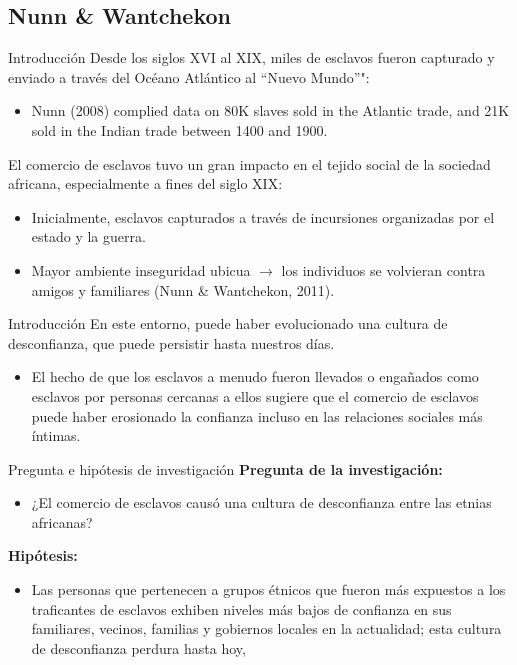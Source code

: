 \documentclass[11pt, aspectratio=169, compress]{beamer}
\begin{document}
\subsection{Nunn \& Wantchekon}
\begin{frame}{Introducción}
Desde los siglos XVI al XIX, miles de esclavos fueron capturado y enviado a través del Océano Atlántico al ``Nuevo Mundo''": 
\begin{itemize}
	\item Nunn (2008) complied data on 80K slaves sold in the Atlantic
	trade, and 21K sold in the Indian trade between 1400 and 1900.
\end{itemize}
El comercio de esclavos tuvo un gran impacto en el tejido social de la sociedad africana, especialmente a fines del siglo XIX: 
\begin{itemize}
	\item  Inicialmente, esclavos capturados a través de incursiones organizadas por el estado y la guerra. 
	\item Mayor ambiente inseguridad ubicua $ \rightarrow $ los individuos se volvieran contra amigos y familiares (Nunn \& Wantchekon, 2011). 
\end{itemize}
\end{frame}
\begin{frame}{Introducción}
En este entorno, puede haber evolucionado una cultura de desconfianza, que puede persistir hasta nuestros días.
\begin{itemize}
	\item El hecho de que los esclavos a menudo fueron llevados o engañados como esclavos por personas cercanas a ellos sugiere que el comercio de esclavos puede haber erosionado la confianza incluso en las relaciones sociales más íntimas.
\end{itemize}
\end{frame}
\begin{frame}{Pregunta e hipótesis de investigación}
\textbf{Pregunta de la investigación: }
\begin{itemize}
	\item ¿El comercio de esclavos causó una cultura de desconfianza entre las etnias africanas?
\end{itemize}
\textbf{Hipótesis: }
\begin{itemize}
	\item Las personas que pertenecen a grupos étnicos que fueron más expuestos a los traficantes de esclavos exhiben niveles más bajos de confianza en sus familiares, vecinos, familias y gobiernos locales en la actualidad; esta cultura de desconfianza perdura hasta hoy, 
\end{itemize}
\end{frame}
\end{document}
